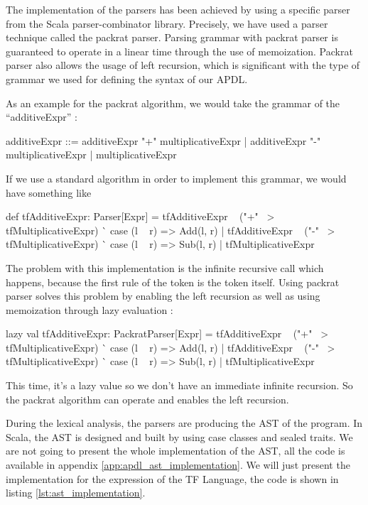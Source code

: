 The implementation of the parsers has been achieved by using a specific parser
from the Scala parser-combinator library. Precisely, we have used a parser
technique called the packrat parser\cite{Ford2006}. Parsing grammar with
packrat parser is guaranteed to operate in a linear time through the use of
memoization\cite{Ford2006}. Packrat parser also allows the usage of left
recursion, which is significant with the type of grammar we used for defining the
syntax of our \gls{APDL}.

As an example for the packrat algorithm, we would take the grammar of the
``additiveExpr'' :

\begin{inlineebnf}
additiveExpr ::= additiveExpr "+" multiplicativeExpr
             | additiveExpr "-" multiplicativeExpr
             | multiplicativeExpr
\end{inlineebnf}

If we use a standard algorithm in order to implement this grammar, we would
have something like

\begin{inlinescala}
def tfAdditiveExpr: Parser[Expr] = {
  tfAdditiveExpr ~ ("+" ~> tfMultiplicativeExpr) ^^ {
    case (l ~ r) => Add(l, r)
  } |
  tfAdditiveExpr ~ ("-" ~> tfMultiplicativeExpr) ^^ {
    case (l ~ r) => Sub(l, r)
  } |
  tfMultiplicativeExpr
}
\end{inlinescala}

The problem with this implementation is the infinite recursive call which
happens, because the first rule of the token is the token itself.
Using packrat parser solves this problem by enabling the left
recursion as well as using memoization through lazy evaluation :

\begin{inlinescala}
lazy val tfAdditiveExpr: PackratParser[Expr] = {
  tfAdditiveExpr ~ ("+" ~> tfMultiplicativeExpr) ^^ {
    case (l ~ r) => Add(l, r)
  } |
  tfAdditiveExpr ~ ("-" ~> tfMultiplicativeExpr) ^^ {
    case (l ~ r) => Sub(l, r)
  } |
  tfMultiplicativeExpr
}
\end{inlinescala}

This time, it's a lazy value so we don't have an immediate infinite recursion. So
the packrat algorithm can operate and enables the left recursion.

During the lexical analysis, the parsers are producing the \gls{AST} of the
program. In Scala, the \gls{AST} is designed and built by using case classes and
sealed traits. We are not going to present the whole implementation of the
\gls{AST}, all the code is available in appendix
\ref{app:apdl_ast_implementation}. We will just present the implementation for
the expression of the \gls{TF} Language, the code is shown in listing
\ref{lst:ast_implementation}.

